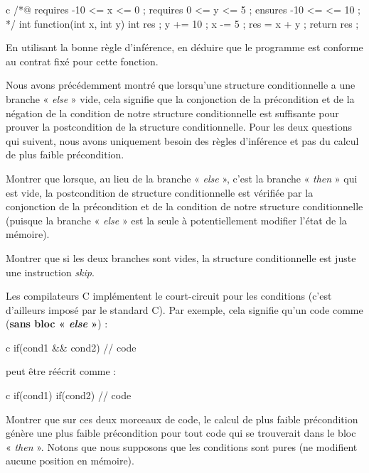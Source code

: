 \begin{CodeBlock}{c}
/*@
  requires -10 <= x <= 0 ;
  requires 0 <= y <= 5 ;
  ensures -10 <= \result <= 10 ;
*/
int function(int x, int y){
  int res ;
  y += 10 ;
  x -= 5 ;
  res = x + y ;
  return res ;
}
\end{CodeBlock}


En utilisant la bonne règle d'inférence, en déduire que le programme est
conforme au contrat fixé pour cette fonction.




Nous avons précédemment montré que lorsqu'une structure conditionnelle a une branche
« \textit{else} » vide, cela signifie que la conjonction de la précondition et de la négation
de la condition de notre structure conditionnelle est suffisante pour prouver la
postcondition de la structure conditionnelle.
Pour les deux questions qui suivent, nous avons uniquement besoin des règles d'inférence
et pas du calcul de plus faible précondition.


Montrer que lorsque, au lieu de la branche « \textit{else} », c'est la branche « \textit{then} » qui est
vide, la postcondition de structure conditionnelle est vérifiée par la conjonction de
la précondition et de la condition de notre structure conditionnelle (puisque
la branche « \textit{else} » est la seule à potentiellement modifier l'état de
la mémoire).


Montrer que si les deux branches sont vides, la structure conditionnelle est juste une
instruction \textit{skip}.




Les compilateurs C implémentent le court-circuit pour les conditions (c'est d'ailleurs
imposé par le standard C). Par exemple, cela signifie qu'un code comme (\textbf{sans
bloc « \textit{else} »}) :


\begin{CodeBlock}{c}
if(cond1 && cond2){
  // code
}
\end{CodeBlock}


peut être réécrit comme :


\begin{CodeBlock}{c}
if(cond1){
  if(cond2){
    // code
  }
}
\end{CodeBlock}


Montrer que sur ces deux morceaux de code, le calcul de plus faible précondition
génère une plus faible précondition pour tout code qui se trouverait dans le bloc
« \textit{then} ». Notons que nous supposons que les conditions sont pures (ne modifient aucune
position en mémoire).



